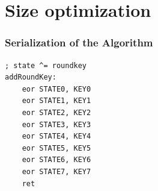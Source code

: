 \documentclass{beamer}
\begin{document}

\section{Size optimization}

\begin{frame}[fragile]
\frametitle{Serialization of the Algorithm}
\begin{lstlisting}
; state ^= roundkey
addRoundKey:
    eor STATE0, KEY0
    eor STATE1, KEY1
    eor STATE2, KEY2
    eor STATE3, KEY3
    eor STATE4, KEY4
    eor STATE5, KEY5
    eor STATE6, KEY6
    eor STATE7, KEY7
    ret
\end{lstlisting}
\end{frame}
\end{document}
